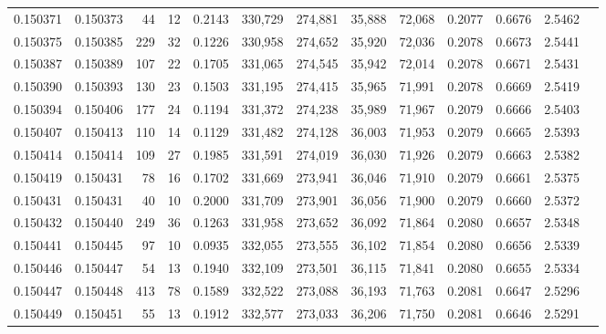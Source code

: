 \begin{tabular}{rrrrrrrrrrrrr}
0.150371 & 0.150373 &    44 &  12 &                                     0.2143 & 330,729 & 274,881 &  35,888 &  72,068 & 0.2077 & 0.6676 & 2.5462 \\
0.150375 & 0.150385 &   229 &  32 &                                     0.1226 & 330,958 & 274,652 &  35,920 &  72,036 & 0.2078 & 0.6673 & 2.5441 \\
0.150387 & 0.150389 &   107 &  22 &                                     0.1705 & 331,065 & 274,545 &  35,942 &  72,014 & 0.2078 & 0.6671 & 2.5431 \\
0.150390 & 0.150393 &   130 &  23 &                                     0.1503 & 331,195 & 274,415 &  35,965 &  71,991 & 0.2078 & 0.6669 & 2.5419 \\
0.150394 & 0.150406 &   177 &  24 &                                     0.1194 & 331,372 & 274,238 &  35,989 &  71,967 & 0.2079 & 0.6666 & 2.5403 \\
0.150407 & 0.150413 &   110 &  14 &                                     0.1129 & 331,482 & 274,128 &  36,003 &  71,953 & 0.2079 & 0.6665 & 2.5393 \\
0.150414 & 0.150414 &   109 &  27 &                                     0.1985 & 331,591 & 274,019 &  36,030 &  71,926 & 0.2079 & 0.6663 & 2.5382 \\
0.150419 & 0.150431 &    78 &  16 &                                     0.1702 & 331,669 & 273,941 &  36,046 &  71,910 & 0.2079 & 0.6661 & 2.5375 \\
0.150431 & 0.150431 &    40 &  10 &                                     0.2000 & 331,709 & 273,901 &  36,056 &  71,900 & 0.2079 & 0.6660 & 2.5372 \\
0.150432 & 0.150440 &   249 &  36 &                                     0.1263 & 331,958 & 273,652 &  36,092 &  71,864 & 0.2080 & 0.6657 & 2.5348 \\
0.150441 & 0.150445 &    97 &  10 &                                     0.0935 & 332,055 & 273,555 &  36,102 &  71,854 & 0.2080 & 0.6656 & 2.5339 \\
0.150446 & 0.150447 &    54 &  13 &                                     0.1940 & 332,109 & 273,501 &  36,115 &  71,841 & 0.2080 & 0.6655 & 2.5334 \\
0.150447 & 0.150448 &   413 &  78 &                                     0.1589 & 332,522 & 273,088 &  36,193 &  71,763 & 0.2081 & 0.6647 & 2.5296 \\
0.150449 & 0.150451 &    55 &  13 &                                     0.1912 & 332,577 & 273,033 &  36,206 &  71,750 & 0.2081 & 0.6646 & 2.5291 \\

\end{tabular}
